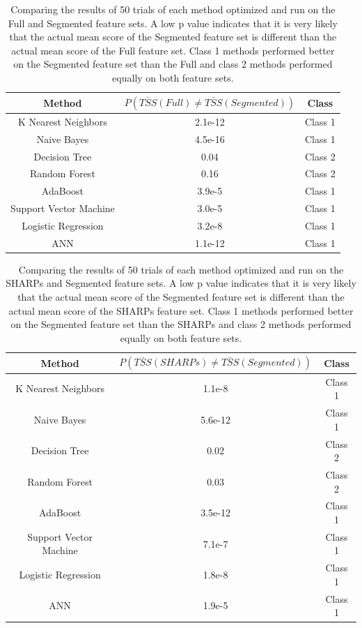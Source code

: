 \documentclass[defaultstyle,11pt]{thesis}
\begin{document}
\begin{table}
\begin{center}
\begin{tabular}{c|c|c}
     Method & $P(\bar{TSS}(Full) \neq \bar{TSS}(Segmented))$ & Class \\
     \hline
     K Nearest Neighbors & 2.1e-12 & Class 1 \\
     Naive Bayes & 4.5e-16 & Class 1 \\
     Decision Tree & 0.04 & Class 2 \\
     Random Forest & 0.16 & Class 2 \\
     AdaBoost & 3.9e-5 & Class 1 \\
     Support Vector Machine & 3.0e-5 & Class 1 \\
     Logistic Regression & 3.2e-8 & Class 1 \\
     ANN & 1.1e-12 & Class 1
\end{tabular}
\caption{Comparing the results of 50 trials of each method optimized and run on the Full and Segmented feature sets. A low p value indicates that it is very likely that the actual mean score of the Segmented feature set is different than the actual mean score of the Full feature set. Class 1 methods performed better on the Segmented feature set than the Full and class 2 methods performed equally on both feature sets.} 
\label{tbl:bsseg}
\end{center}
\end{table}

\begin{table}
\begin{center}
\begin{tabular}{c|c|c}
     Method & $P(\bar{TSS}(SHARPs) \neq \bar{TSS}(Segmented))$ & Class \\
     \hline
     K Nearest Neighbors & 1.1e-8 & Class 1 \\
     Naive Bayes & 5.6e-12 & Class 1 \\
     Decision Tree & 0.02 & Class 2 \\
     Random Forest & 0.03 & Class 2 \\
     AdaBoost & 3.5e-12 & Class 1 \\
     Support Vector Machine & 7.1e-7 & Class 1 \\
     Logistic Regression & 1.8e-8 & Class 1 \\
     ANN & 1.9e-5 & Class 1
\end{tabular}
\caption{Comparing the results of 50 trials of each method optimized and run on the SHARPs and Segmented feature sets. A low p value indicates that it is very likely that the actual mean score of the Segmented feature set is different than the actual mean score of the SHARPs feature set. Class 1 methods performed better on the Segmented feature set than the SHARPs and class 2 methods performed equally on both feature sets.} 
\label{tbl:shpseg}
\end{center}
\end{table}
\end{document}
